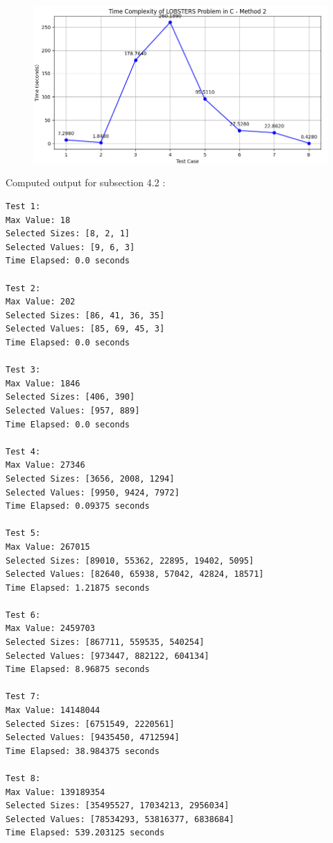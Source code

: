 \documentclass{article}%
\begin{document}
\begin{figure}[h!]%
\centering%
\includegraphics[width=\textwidth]{time_complexity_c_2.png}%
\end{figure}

%
\newpage%


    
    \vspace*{\fill}
                        
Computed output for subsection 4.2 : 
                        
\small
\begin{verbatim}
Test 1:
Max Value: 18
Selected Sizes: [8, 2, 1]
Selected Values: [9, 6, 3]
Time Elapsed: 0.0 seconds
                        
Test 2:
Max Value: 202
Selected Sizes: [86, 41, 36, 35]
Selected Values: [85, 69, 45, 3]
Time Elapsed: 0.0 seconds
                        
Test 3:
Max Value: 1846
Selected Sizes: [406, 390]
Selected Values: [957, 889]
Time Elapsed: 0.0 seconds
                        
Test 4:
Max Value: 27346
Selected Sizes: [3656, 2008, 1294]
Selected Values: [9950, 9424, 7972]
Time Elapsed: 0.09375 seconds
                        
Test 5:
Max Value: 267015
Selected Sizes: [89010, 55362, 22895, 19402, 5095]
Selected Values: [82640, 65938, 57042, 42824, 18571]
Time Elapsed: 1.21875 seconds
                        
Test 6:
Max Value: 2459703
Selected Sizes: [867711, 559535, 540254]
Selected Values: [973447, 882122, 604134]
Time Elapsed: 8.96875 seconds
                        
Test 7:
Max Value: 14148044
Selected Sizes: [6751549, 2220561]
Selected Values: [9435450, 4712594]
Time Elapsed: 38.984375 seconds
                        
Test 8:
Max Value: 139189354
Selected Sizes: [35495527, 17034213, 2956034]
Selected Values: [78534293, 53816377, 6838684]
Time Elapsed: 539.203125 seconds
                        
\end{verbatim}
\end{document}
